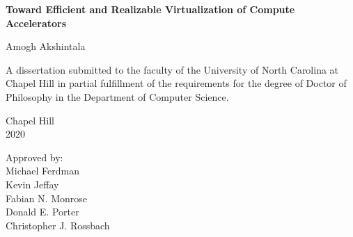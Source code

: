 \begin{titlepage}
\begin{center}


\vspace{2in}
\begin{singlespace}
\bf
Toward Efficient and Realizable Virtualization of Compute Accelerators
\end{singlespace}


\vspace{61pt} %
\large Amogh Akshintala
\end{center}



\vspace{50pt}
\begin{singlespace}
\noindent \large
A dissertation submitted to the faculty of the University of North Carolina at Chapel Hill
in partial fulfillment of the requirements for the degree of Doctor of Philosophy in
the Department of Computer Science.
\end{singlespace}


\vspace{50pt}
\begin{center}
\begin{singlespace} \large
Chapel Hill\\
2020
\end{singlespace}
\end{center}


\vfill
\begin{flushright}
\begin{minipage}[t]{1.8in} \large
Approved by:\\
Michael Ferdman \\
Kevin Jeffay \\
Fabian N. Monrose  \\
Donald E. Porter \\
Christopher J. Rossbach
\end{minipage}
\end{flushright}

\end{titlepage}